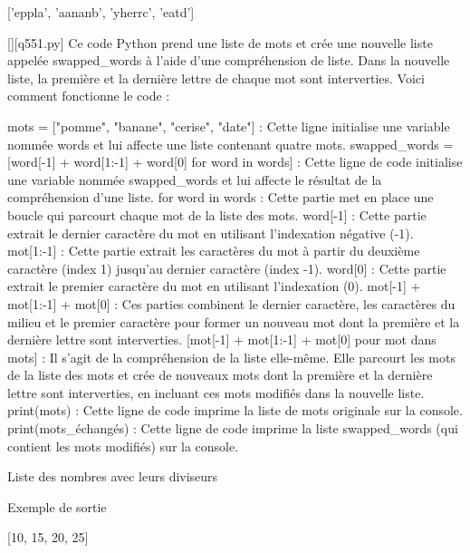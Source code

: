 ['eppla', 'aananb', 'yherrc', 'eatd']
        \par
        \begin{solution}
            \renewcommand{\nomfichier}{q551.py}
            \pythonfile{\chemincode \nomfichier}[][\nomfichier]
            Ce code Python prend une liste de mots et crée une nouvelle liste appelée swapped\_words à l'aide d'une compréhension de liste. Dans la nouvelle liste, la première et la dernière lettre de chaque mot sont interverties. Voici comment fonctionne le code :

    mots = ["pomme", "banane", "cerise", "date"] : Cette ligne initialise une variable nommée words et lui affecte une liste contenant quatre mots.
    swapped\_words = [word[-1] + word[1:-1] + word[0] for word in words] : Cette ligne de code initialise une variable nommée swapped\_words et lui affecte le résultat de la compréhension d'une liste.
        for word in words : Cette partie met en place une boucle qui parcourt chaque mot de la liste des mots.
        word[-1] : Cette partie extrait le dernier caractère du mot en utilisant l'indexation négative (-1).
        mot[1:-1] : Cette partie extrait les caractères du mot à partir du deuxième caractère (index 1) jusqu'au dernier caractère (index -1).
        word[0] : Cette partie extrait le premier caractère du mot en utilisant l'indexation (0).
        mot[-1] + mot[1:-1] + mot[0] : Ces parties combinent le dernier caractère, les caractères du milieu et le premier caractère pour former un nouveau mot dont la première et la dernière lettre sont interverties.
        [mot[-1] + mot[1:-1] + mot[0] pour mot dans mots] : Il s'agit de la compréhension de la liste elle-même. Elle parcourt les mots de la liste des mots et crée de nouveaux mots dont la première et la dernière lettre sont interverties, en incluant ces mots modifiés dans la nouvelle liste.
    print(mots) : Cette ligne de code imprime la liste de mots originale sur la console.
    print(mots\_échangés) : Cette ligne de code imprime la liste swapped\_words (qui contient les mots modifiés) sur la console.
        \end{solution}
        

        \question
        Liste des nombres avec leurs diviseurs

Exemple de sortie

[10, 15, 20, 25]


